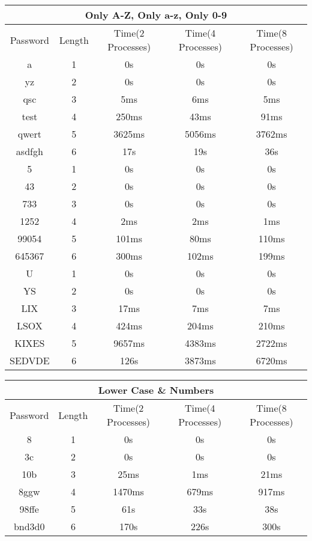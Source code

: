 \documentclass[11pt]{article}
\begin{document}
\begin{center}
 \begin{tabular}{||c c c c c||} 
 \hline
 
 \multicolumn{5}{|c|}{Only A-Z, Only a-z, Only 0-9} \\
 \hline
 \hline
 Password & Length & Time(2 Processes) & Time(4 Processes) & Time(8 Processes) \\ [0.5ex] 
 \hline\hline
 a & 1 & 0s & 0s & 0s\\ 
 \hline
 yz & 2 & 0s & 0s & 0s\\
 \hline
 qsc & 3 & 5ms & 6ms & 5ms\\
 \hline
 test & 4 & 250ms & 43ms & 91ms\\
 \hline
 qwert & 5 & 3625ms & 5056ms & 3762ms\\ 
 \hline
 asdfgh & 6 & 17s & 19s & 36s\\
 \hline 
  5 & 1 & 0s & 0s & 0s\\
  \hline 
  43 & 2 & 0s & 0s & 0s \\
  \hline
  733 & 3 & 0s & 0s & 0s\\
  \hline
  1252 & 4 & 2ms & 2ms & 1ms\\
  \hline
  99054 & 5 & 101ms & 80ms & 110ms\\
  \hline 
  645367 & 6 & 300ms & 102ms & 199ms\\
  \hline
  U & 1 & 0s & 0s & 0s\\
  \hline
  YS & 2 & 0s & 0s & 0s\\
  \hline
  LIX & 3 & 17ms & 7ms & 7ms\\
  \hline
  LSOX & 4 & 424ms & 204ms & 210ms\\
  \hline
  KIXES & 5 & 9657ms & 4383ms & 2722ms\\
  \hline 
  SEDVDE & 6 & 126s & 3873ms &  6720ms\\
 [1ex] 
 \hline
\end{tabular}
\end{center}


\begin{center}
 \begin{tabular}{||c c c c c||} 
 \hline
 
 \multicolumn{5}{|c|}{Lower Case \& Numbers} \\
 \hline
 \hline
 Password & Length & Time(2 Processes) & Time(4 Processes) & Time(8 Processes) \\ [0.5ex] 
 \hline\hline
 8 & 1 & 0s & 0s & 0s\\ 
 \hline
 3c & 2 & 0s & 0s & 0s\\
 \hline
 10b & 3 & 25ms & 1ms & 21ms\\
 \hline
 8ggw & 4 & 1470ms & 679ms & 917ms\\
 \hline
 98ffe & 5 & 61s & 33s & 38s\\ 
 \hline
 bnd3d0 & 6 & 170s & 226s & 300s\\
 [1ex] 
 \hline
\end{tabular}
\end{center}
\end{document}
